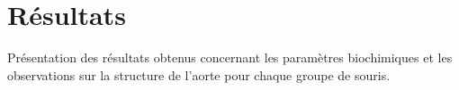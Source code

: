 \section{Résultats}
Présentation des résultats obtenus concernant les paramètres biochimiques et les observations sur la structure de l'aorte pour chaque groupe de souris.
